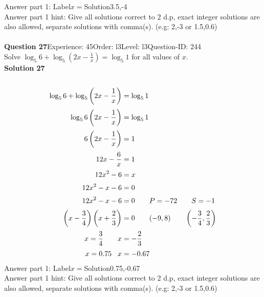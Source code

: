 \documentclass{article}
\begin{document}
Answer part 1: \hspace{10pt}Label\hspace{10pt}$x=$\hspace{10pt}Solution\hspace{10pt}3.5,-4\\
Answer part 1 hint: \hspace{15pt} Give all solutions correct to 2 d.p, exact integer solutions are also allowed, separate solutions with comma(s). (e.g: 2,-3 or 1.5,0.6)\\
\\[4pt]
\noindent\textbf{Question 27}\hspace{20pt}Experience: 45\hspace{20pt}Order: l3\hspace{20pt}Level: l3\hspace{20pt}Question-ID: 244\\[2pt]
Solve $\log_{5}6+\log_{5}\left(2x-\displaystyle\frac{1}{x}\right)=\log_{5}1$ for all values of $x$.\\[4pt]
\noindent\textbf{Solution 27}\\[2pt]
\\[-35pt]\begin{align*}
\log_{5}6+\log_{5}\left(2x-\displaystyle\frac{1}{x}\right)&=\log_{5}1\\[2pt]
\log_{5}6\left(2x-\displaystyle\frac{1}{x}\right)&=\log_{5}1\\[2pt]
6\left(2x-\displaystyle\frac{1}{x}\right)&=1\\[2pt]
12x-\displaystyle\frac{6}{x}&=1\\[2pt]
12x^2-6&=x\\[2pt]
12x^2-x-6&=0\\[2pt]
12x^2-x-6&=0\qquad P=-72 \qquad S=-1\\[2pt]
\left(x-\displaystyle\frac{3}{4}\right)\left(x+\displaystyle\frac{2}{3}\right)&=0\qquad (-9,8)\qquad \left(-\displaystyle\frac{3}{4},\displaystyle\frac{2}{3}\right)\\[2pt]
x=\displaystyle\frac{3}{4}\qquad x&=-\displaystyle\frac{2}{3}\\[2pt]
x=0.75\hspace{8.5pt}x&=-0.67
\end{align*}
Answer part 1: \hspace{10pt}Label\hspace{10pt}$x=$\hspace{10pt}Solution\hspace{10pt}0.75,-0.67\\
Answer part 1 hint: \hspace{15pt}Give all solutions correct to 2 d.p, exact integer solutions are also allowed, separate solutions with comma(s). (e.g: 2,-3 or 1.5,0.6)\\
\end{document}
